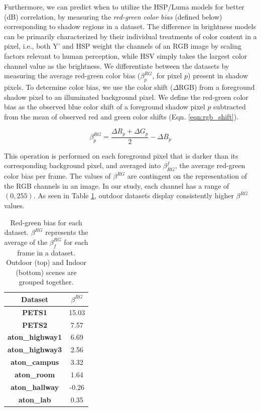 Furthermore, we can predict when to utilize the HSP/Luma models for better (dB) correlation, by measuring the \textit{red-green color bias} (defined below) corresponding to shadow regions in a dataset. The difference in brightness models can be primarily characterized by their individual treatments of color content in a pixel, i.e., both Y' and HSP weight the channels of an RGB image by scaling factors relevant to human perception, while HSV simply takes the largest color channel value as the brightness. We differentiate between the datasets by measuring the average red-green color bias ($\beta^{RG}_{p}$, for pixel $p$) present in shadow pixels. To determine color bias, we use the color shift ($\Delta$RGB) from a foreground shadow pixel to an illuminated background pixel. We define the red-green color bias as the observed blue color shift of a foreground shadow pixel $p$ subtracted from the mean of observed red and green color shifts (Eqn. \ref{eqn:rgb_shift}).

\begin{equation}
\beta^{RG}_{p} = \dfrac{\Delta R_{p} + \Delta G_{p}}{2} - \Delta B_{p}
\label{eqn:rgb_shift}
\end{equation}

This operation is performed on each foreground pixel that is darker than its corresponding background pixel, and averaged into $\beta^{f}_{RG}$, the average red-green color bias per frame. The values of $\beta^{RG}$ are contingent on the representation of the RGB channels in an image. In our study, each channel has a range of $(0, 255)$. As seen in Table \ref{table:rg_bias}, outdoor datasets display consistently higher $\beta^{RG}$ values.

\begin{table}
\centering
\caption{Red-green bias for each dataset. $\beta^{RG}$ represents the average of the $\beta^{RG}_{f}$ for each frame in a dataset. Outdoor (top) and Indoor (bottom) scenes are grouped together.}
\begin{tabular}{ |c|c| }
	\hline
	\textbf{Dataset} & \textbf{$\beta^{RG}$} \\
	\hline
	\hline
	\textbf{PETS1} & 15.03 \\
	\hline
	\textbf{PETS2} & 7.57 \\
	\hline
	\textbf{aton\_highway1} & 6.69 \\
	\hline
	\textbf{aton\_highway3} & 2.56 \\
	\hline
	\textbf{aton\_campus} & 3.32 \\
	\hline
	\hline
	\textbf{aton\_room} & 1.64 \\
	\hline
	\textbf{aton\_hallway} & -0.26 \\
	\hline
	\textbf{aton\_lab} & 0.35 \\
	\hline
\end{tabular}

\label{table:rg_bias}
\end{table}

